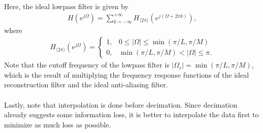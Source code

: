 \documentclass{report}
\begin{document}
\begin{center}
\end{center}
Here, the ideal lowpass filter is given by
\begin{align}
    H(e^{j\Omega}) = \sum_{k=-\infty}^{+\infty} H_{\langle 2\pi\rangle}(e^{j(\Omega+2\pi k)}),
\end{align}
where 
\begin{align}
    H_{\langle 2\pi\rangle}(e^{j\Omega}) = 
    \begin{cases}
        1, & 0\leq|\Omega|\leq\min(\pi/L,\pi/M) \\
        0, & \min(\pi/L,\pi/M)<|\Omega|\leq\pi.
    \end{cases}
\end{align}
Note that the cutoff frequency of the lowpass filter is $|\Omega_c|=\min(\pi/L,\pi/M)$, which is the result of 
multiplying the frequency response functions of the ideal reconstruction filter and the ideal anti-aliasing filter.
\\ \\
Lastly, note that interpolation is done before decimation. Since decimation already suggests some information loss, it is 
better to interpolate the data first to minimize as much loss as possible.
\end{document}
